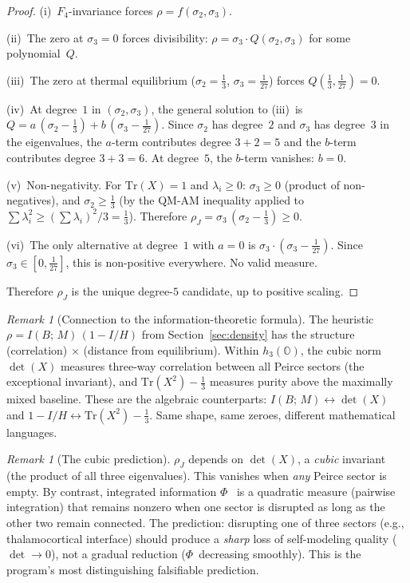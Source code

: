 \documentclass[12pt]{article}
\theoremstyle{remark}
\newtheorem{remark}[theorem]{Remark}
\begin{document}
\begin{proof}
(i)~$F_4$-invariance forces $\rho = f(\sigma_2, \sigma_3)$.

\smallskip\noindent
(ii)~The zero at $\sigma_3 = 0$ forces divisibility:
$\rho = \sigma_3 \cdot Q(\sigma_2, \sigma_3)$ for some polynomial~$Q$.

\smallskip\noindent
(iii)~The zero at thermal equilibrium
($\sigma_2 = \tfrac{1}{3}$, $\sigma_3 = \tfrac{1}{27}$) forces
$Q(\tfrac{1}{3}, \tfrac{1}{27}) = 0$.

\smallskip\noindent
(iv)~At degree~$1$ in $(\sigma_2, \sigma_3)$, the general solution to
(iii)~is $Q = a\,(\sigma_2 - \tfrac{1}{3}) + b\,(\sigma_3 -
\tfrac{1}{27})$.  Since $\sigma_2$ has degree~$2$ and $\sigma_3$ has
degree~$3$ in the eigenvalues, the $a$-term contributes degree
$3 + 2 = 5$ and the $b$-term contributes degree $3 + 3 = 6$.  At
degree~$5$, the $b$-term vanishes: $b = 0$.

\smallskip\noindent
(v)~Non-negativity.  For $\mathrm{Tr}(X) = 1$ and
$\lambda_i \geq 0$: $\sigma_3 \geq 0$ (product of non-negatives), and
$\sigma_2 \geq \tfrac{1}{3}$ (by the QM-AM inequality applied to
$\sum \lambda_i^2 \geq (\sum \lambda_i)^2 / 3 = \tfrac{1}{3}$).
Therefore $\rho_J = \sigma_3\,(\sigma_2 - \tfrac{1}{3}) \geq 0$.

\smallskip\noindent
(vi)~The only alternative at degree~$1$ with $a = 0$ is
$\sigma_3 \cdot (\sigma_3 - \tfrac{1}{27})$.  Since
$\sigma_3 \in [0, \tfrac{1}{27}]$, this is non-positive everywhere.
No valid measure.

\smallskip\noindent
Therefore $\rho_J$ is the unique degree-$5$ candidate, up to positive
scaling.
\end{proof}

\begin{remark}[Connection to the information-theoretic formula]
The heuristic $\rho = I(B;\,M)\,(1 - I/H)$ from
Section~\ref{sec:density} has the structure (correlation) $\times$
(distance from equilibrium).  Within $h_3(\mathbb{O})$, the cubic norm
$\det(X)$ measures three-way correlation between all Peirce sectors
(the exceptional invariant), and $\mathrm{Tr}(X^2) - \tfrac{1}{3}$
measures purity above the maximally mixed baseline.  These are the
algebraic counterparts: $I(B;\,M) \leftrightarrow \det(X)$ and
$1 - I/H \leftrightarrow \mathrm{Tr}(X^2) - \tfrac{1}{3}$.  Same
shape, same zeroes, different mathematical languages.
\end{remark}

\begin{remark}[The cubic prediction]\label{rem:cubic}
$\rho_J$ depends on $\det(X)$, a \emph{cubic} invariant (the product
of all three eigenvalues).  This vanishes when \emph{any} Peirce sector
is empty.  By contrast, integrated information
$\Phi$~\cite{tononi2008} is a quadratic measure (pairwise integration)
that remains nonzero when one sector is disrupted as long as the other
two remain connected.  The prediction: disrupting one of three sectors
(e.g., thalamocortical interface) should produce a \emph{sharp} loss of
self-modeling quality ($\det \to 0$), not a gradual reduction
($\Phi$~decreasing smoothly).  This is the program's most
distinguishing falsifiable prediction.
\end{remark}
\end{document}
